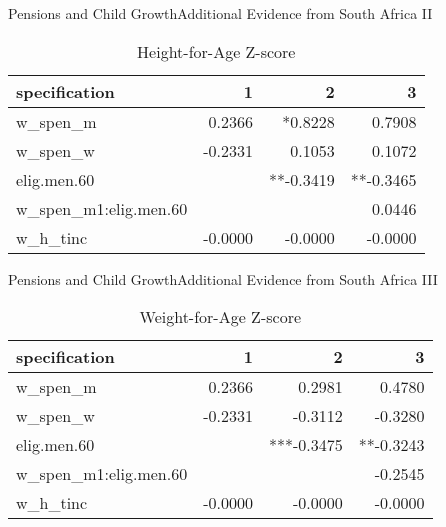 \documentclass{beamer}
\begin{document}
\begin{frame}{Pensions and Child Growth}{Additional Evidence from South Africa II}
	\begin{table}[!ht]
	\centering
	\caption{Height-for-Age Z-score}
	\label{sa:ta:haz}
		\begin{tabular}{l|rrr}
		\hline
		specification & 1 & 2 & 3\\
		\hline
		w\_spen\_m & 0.2366 & *0.8228 & 0.7908 \\
		w\_spen\_w & -0.2331 & 0.1053 & 0.1072 \\
		elig.men.60 & & **-0.3419 & **-0.3465 \\
		w\_spen\_m1:elig.men.60 & & & 0.0446 \\
		w\_h\_tinc & -0.0000 & -0.0000 & -0.0000 \\
		\end{tabular}
	\end{table}
\end{frame}

\begin{frame}{Pensions and Child Growth}{Additional Evidence from South Africa III}
	\begin{table}[!ht]
	\centering
	\caption{Weight-for-Age Z-score}
	\label{sa:ta:waz}
	\begin{tabular}{l|rrr}
		\hline
		specification & 1 & 2 & 3\\
		\hline
		w\_spen\_m & 0.2366 & 0.2981 & 0.4780 \\
		w\_spen\_w & -0.2331 & -0.3112 & -0.3280 \\
		elig.men.60 & & ***-0.3475 & **-0.3243 \\
		w\_spen\_m1:elig.men.60 & & & -0.2545 \\
		w\_h\_tinc & -0.0000 & -0.0000 & -0.0000 \\
		\end{tabular}
	\end{table}
\end{frame}
\end{document}
